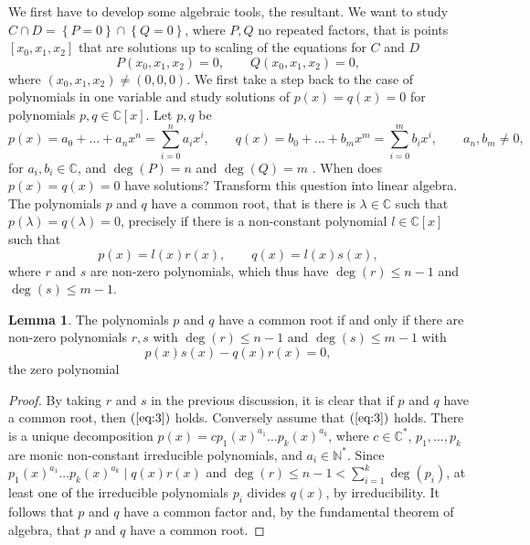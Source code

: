 \documentclass{article}
\newcommand{\N}{\mathbb{N}}
\newcommand{\C}{\mathbb{C}}
\newcommand{\rb}[1]{\left( #1 \right)}
\renewcommand{\sb}[1]{\left[ #1 \right]}
\newcommand{\cb}[1]{\left\{ #1 \right\}}
\theoremstyle{definition}\newtheorem{definition}{Definition}[section]
\theoremstyle{definition}\newtheorem{notation}[definition]{Notation}
\theoremstyle{definition}\newtheorem{remark}[definition]{Remark}
\theoremstyle{definition}\newtheorem{example}[definition]{Example}
\theoremstyle{definition}\newtheorem{fact}{Fact}
\theoremstyle{definition}\newtheorem{exercise}{Exercise}
\newtheorem{lemma}[definition]{Lemma}
\begin{document}
We first have to develop some algebraic tools, the resultant. We want to study $ C \cap D = \cb{P = 0} \cap \cb{Q = 0} $, where $ P, Q $ no repeated factors, that is points $ \sb{x_0, x_1, x_2} $ that are solutions up to scaling of the equations for $ C $ and $ D $
$$ P\rb{x_0, x_1, x_2} = 0, \qquad Q\rb{x_0, x_1, x_2} = 0, $$
where $ \rb{x_0, x_1, x_2} \ne \rb{0, 0, 0} $. We first take a step back to the case of polynomials in one variable and study solutions of $ p\rb{x} = q\rb{x} = 0 $ for polynomials $ p, q \in \C\sb{x} $. Let $ p, q $ be
$$ p\rb{x} = a_0 + \dots + a_nx^n = \sum_{i = 0}^n a_ix^i, \qquad q\rb{x} = b_0 + \dots + b_mx^m = \sum_{i = 0}^m b_ix^i, \qquad a_n, b_m \ne 0, $$
for $ a_i, b_i \in \C $, and $ \deg\rb{P} = n $ and $ \deg\rb{Q} = m $ . When does $ p\rb{x} = q\rb{x} = 0 $ have solutions? Transform this question into linear algebra. The polynomials $ p $ and $ q $ have a common root, that is there is $ \lambda \in \C $ such that $ p\rb{\lambda} = q\rb{\lambda} = 0 $, precisely if there is a non-constant polynomial $ l \in \C\sb{x} $ such that
$$ p\rb{x} = l\rb{x}r\rb{x}, \qquad q\rb{x} = l\rb{x}s\rb{x}, $$
where $ r $ and $ s $ are non-zero polynomials, which thus have $ \deg\rb{r} \le n - 1 $ and $ \deg\rb{s} \le m - 1 $.

\begin{lemma}
\label{lem:9.1}
The polynomials $ p $ and $ q $ have a common root if and only if there are non-zero polynomials $ r, s $ with $ \deg\rb{r} \le n - 1 $ and $ \deg\rb{s} \le m - 1 $ with
\begin{equation}
\label{eq:3}
p\rb{x}s\rb{x} - q\rb{x}r\rb{x} = 0,
\end{equation}
the zero polynomial
\end{lemma}

\begin{proof}
By taking $ r $ and $ s $ in the previous discussion, it is clear that if $ p $ and $ q $ have a common root, then $ \rb{\ref{eq:3}} $ holds. Conversely assume that $ \rb{\ref{eq:3}} $ holds. There is a unique decomposition $ p\rb{x} = cp_1\rb{x}^{a_1} \dots p_k\rb{x}^{a_k} $, where $ c \in \C^* $, $ p_1, \dots, p_k $ are monic non-constant irreducible polynomials, and $ a_i \in \N^* $. Since $ p_1\rb{x}^{a_1} \dots p_k\rb{x}^{a_k} \mid q\rb{x}r\rb{x} $ and $ \deg\rb{r} \le n - 1 < \sum_{i = 1}^k \deg\rb{p_i} $, at least one of the irreducible polynomials $ p_i $ divides $ q\rb{x} $, by irreducibility. It follows that $ p $ and $ q $ have a common factor and, by the fundamental theorem of algebra, that $ p $ and $ q $ have a common root.
\end{proof}
\end{document}
